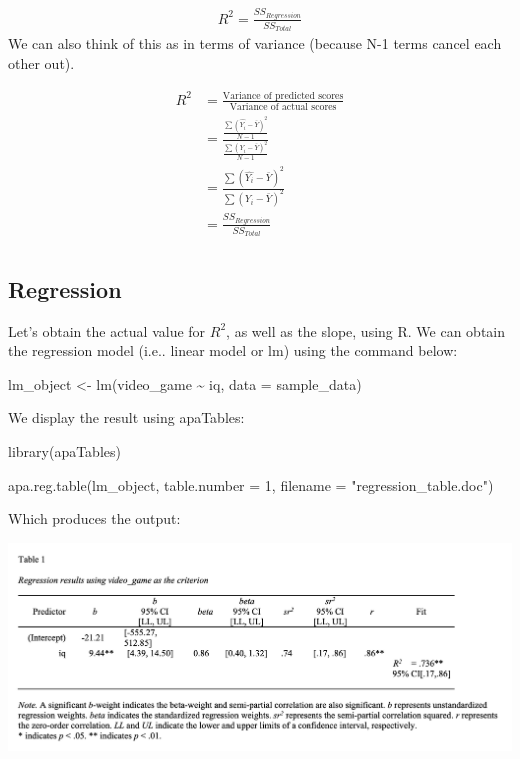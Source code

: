 \documentclass[
]{krantz}
\makeatletter
\newenvironment{Shaded}{\begin{snugshade}}{\end{snugshade}}
\newcommand{\AttributeTok}[1]{\textcolor[rgb]{0.61,0.61,0.61}{#1}}
\newcommand{\DecValTok}[1]{\textcolor[rgb]{0.06,0.06,0.06}{#1}}
\newcommand{\FunctionTok}[1]{\textcolor[rgb]{0,0,0}{#1}}
\newcommand{\NormalTok}[1]{#1}
\newcommand{\OtherTok}[1]{\textcolor[rgb]{0.37,0.37,0.37}{#1}}
\newcommand{\SpecialCharTok}[1]{\textcolor[rgb]{0,0,0}{#1}}
\newcommand{\StringTok}[1]{\textcolor[rgb]{0.5,0.5,0.5}{#1}}
\newenvironment{kframe}{%
\medskip{}
\setlength{\fboxsep}{.8em}
 \def\at@end@of@kframe{}%
 \ifinner\ifhmode%
  \def\at@end@of@kframe{\end{minipage}}%
  \begin{minipage}{\columnwidth}%
 \fi\fi%
 \def\FrameCommand##1{\hskip\@totalleftmargin \hskip-\fboxsep
 \colorbox{shadecolor}{##1}\hskip-\fboxsep
     \hskip-\linewidth \hskip-\@totalleftmargin \hskip\columnwidth}%
 \MakeFramed {\advance\hsize-\width
   \@totalleftmargin\z@ \linewidth\hsize
   \@setminipage}}%
 {\par\unskip\endMakeFramed%
 \at@end@of@kframe}
\renewenvironment{Shaded}{\begin{kframe}}{\end{kframe}}
\makeatother
\begin{document}
\[
\begin{aligned}
R^2 = \frac{SS_{Regression}}{SS_{Total}}
\end{aligned}
\]
We can also think of this as in terms of variance (because N-1 terms cancel each other out).

\[
\begin{aligned}
R^2 &= \frac{\text{Variance of predicted scores}}{\text{Variance of actual scores}} \\
&= \frac{\frac{\sum{(\hat{Y_i} - \bar{Y})^2}}{N-1}}{\frac{\sum{(Y_i - \bar{Y})^2}}{N-1}} \\
&= \frac{\sum{(\hat{Y_i} - \bar{Y})^2}}{\sum{(Y_i - \bar{Y})^2}} \\
&= \frac{SS_{Regression}}{SS_{Total}}\\
\end{aligned}
\]

\hypertarget{regression}{%
\subsection{Regression}\label{regression}}

Let's obtain the actual value for \(R^2\), as well as the slope, using R. We can obtain the regression model (i.e.. linear model or lm) using the command below:

\begin{Shaded}
\begin{Highlighting}[]
\NormalTok{lm\_object }\OtherTok{\textless{}{-}} \FunctionTok{lm}\NormalTok{(video\_game }\SpecialCharTok{\textasciitilde{}}\NormalTok{ iq,}
                \AttributeTok{data =}\NormalTok{ sample\_data)}
\end{Highlighting}
\end{Shaded}

We display the result using apaTables:

\begin{Shaded}
\begin{Highlighting}[]
\FunctionTok{library}\NormalTok{(apaTables)}

\FunctionTok{apa.reg.table}\NormalTok{(lm\_object,}
              \AttributeTok{table.number =} \DecValTok{1}\NormalTok{,}
              \AttributeTok{filename =} \StringTok{"regression\_table.doc"}\NormalTok{)}
\end{Highlighting}
\end{Shaded}

Which produces the output:

\includegraphics[width=28.28in]{ch_correlation/images/regression_output}
\end{document}
